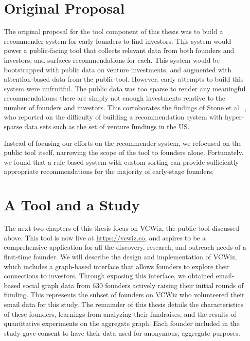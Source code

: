 \section{Original Proposal}

The original proposal for the tool component of this thesis was to build a recommender system for early founders to find investors. This system would power a public-facing tool that collects relevant data from both founders and investors, and surfaces recommendations for each. This system would be bootstrapped with public data on venture investments, and augmented with attention-based data from the public tool. However, early attempts to build this system were unfruitful. The public data was too sparse to render any meaningful recommendations: there are simply not enough investments relative to the number of founders and investors. This corroborates the findings of Stone et al.~\cite{Stone:2013:EST:2541167.2507882}, who reported on the difficulty of building a recommendation system with hyper-sparse data sets such as the set of venture fundings in the US.

Instead of focusing our efforts on the recommender system, we refocused on the public tool itself, narrowing the scope of the tool to founders alone. Fortunately, we found that a rule-based system with custom sorting can provide sufficiently appropriate recommendations for the majority of early-stage founders.

\section{A Tool and a Study}

The next two chapters of this thesis focus on VCWiz, the public tool discussed above. This tool is now live at \url{https://vcwiz.co}, and aspires to be a comprehensive application for all the discovery, research, and outreach needs of a first-time founder. We will describe the design and implementation of VCWiz, which includes a graph-based interface that allows founders to explore their connections to investors. Through exposing this interface, we obtained email-based social graph data from $630$ founders actively raising their initial rounds of funding. This represents the subset of founders on VCWiz who volunteered their email data for this study. The remainder of this thesis details the characteristics of these founders, learnings from analyzing their fundraises, and the results of quantitative experiments on the aggregate graph. Each founder included in the study gave consent to have their data used for anonymous, aggregate purposes.

